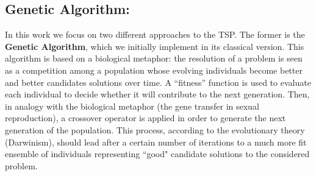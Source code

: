 \subsection{Genetic Algorithm:}
In this work we focus on two different approaches to the TSP.
The former is the \textbf{Genetic Algorithm}, which we initially implement in its classical version.
This algorithm is based on a biological metaphor: the resolution of a problem is seen as a competition among a population whose evolving individuals become better and better candidates solutions over time. 
A “fitness” function is used to evaluate each individual to decide whether it will contribute to the next
generation. 
Then, in analogy with the biological metaphor (the gene transfer in sexual reproduction), a crossover operator is applied in order to generate the next generation of the population.
This process, according to the evolutionary theory (Darwinism), should lead after a certain number of iterations to a much more fit ensemble of individuals representing ``good" candidate solutions to the considered problem.

